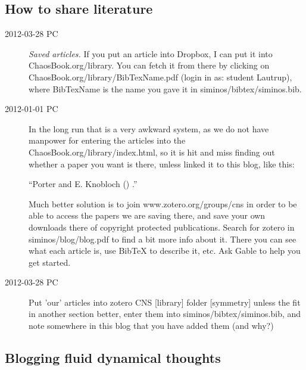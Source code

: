 \subsection{How to share literature}
\label{s:HowToLit}

\begin{description}

\item[2012-03-28 PC] \emph{Saved articles.} If you put an article into
Dropbox, I can put it into 
{ChaosBook.org/library}. You can fetch it from there by clicking on
ChaosBook.org/library/BibTexName.pdf (login in as: student Lautrup),
where BibTexName is the name you gave it in siminos/bibtex/siminos.bib.

\item[2012-01-01 PC] In the long run that is a very awkward system, as we
do not have manpower for entering the articles into the
ChaosBook.org/library/index.html, so it is hit and miss finding out
whether a paper you want is there, unless linked it to this blog, like
this:

``Porter and E. Knobloch
()
.''

Much better solution is to join 
{www.zotero.org/groups/cns} in order to be able to access the papers we
are saving there, and save your own downloads there of copyright
protected publications. Search for zotero in siminos/blog/blog.pdf to
find a bit more info about it. There you can see what each article is,
use BibTeX to describe it, etc. Ask Gable to help you get started.

\item[2012-03-28 PC]
Put 'our' articles into zotero CNS [library] folder [symmetry] unless the
fit in another section better, enter them into
siminos/bibtex/siminos.bib, and note somewhere in this blog that you have
added them (and why?)

\end{description}



\subsection{Blogging fluid dynamical thoughts}

